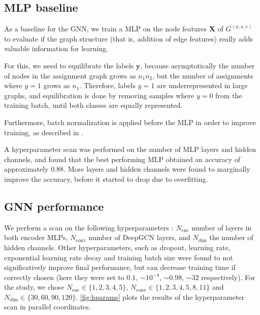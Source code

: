 \documentclass[10pt,conference,compsocconf,a4paper]{IEEEtran}
\renewcommand{\vec}[1]{\boldsymbol{#1}}
\newcommand*{\shortautoref}[1]{%
	\begingroup
	\def\equationautorefname{\textsc{Eq.}}%
	\def\tableautorefname{\textsc{Tab.}}%
	\def\figureautorefname{\textsc{Fig.}}%
	\autoref{#1}%
	\endgroup
}
\begin{document}
	\subsection{MLP baseline}

		As a baseline for the GNN, we train a MLP on the node features $\vec{X}$ of $G^{(a;x,e)}$ to evaluate if the graph structure (that is, addition of edge features) really adds valuable information for learning.

		For this, we need to equilibrate the labels $\vec{y}$, because asymptotically the number of nodes in the assignment graph grows as $n_1 n_2$, but the number of assignments where $y=1$ grows as $n_1$. Therefore, labels $y=1$ are underrepresented in large graphs, and equilibration is done by removing samples where $y=0$ from the training batch, until both classes are equally represented.

		Furthermore, batch normalization is applied before the MLP in order to improve training, as described in \cite{ioffe_batch_2015}.

		A hyperparameter scan was performed on the number of MLP layers and hidden channels, and found that the best performing MLP obtained an accuracy of approximately $0.88$. More layers and hidden channels were found to marginally improve the accuracy, before it started to drop due to overfitting.

	\subsection{GNN performance}

		We perform a scan on the following hyperparameters : $N_\textrm{enc}$ number of layers in both encoder MLPs, $N_\textrm{conv}$ number of DeepGCN layers, and $N_\textrm{dim}$ the number of hidden channels. Other hyperparameters, such as dropout, learning rate, exponential learning rate decay and training batch size were found to not significatively improve final performance, but can decrease training time if correctly chosen (here they were set to $0.1$, $\sim 10^{-4}$, $\sim 0.98$, $\sim 32$ respectively). For the study, we chose $N_\textrm{enc} \in \{1,2,3,4,5\}$, $N_\textrm{conv} \in \{1,2,3,4,5,8,11\}$ and $N_\textrm{dim} \in \{30, 60, 90, 120\}$. \shortautoref{fig:hparams} plots the results of the hyperparameter scan in parallel coordinates.
\end{document}
